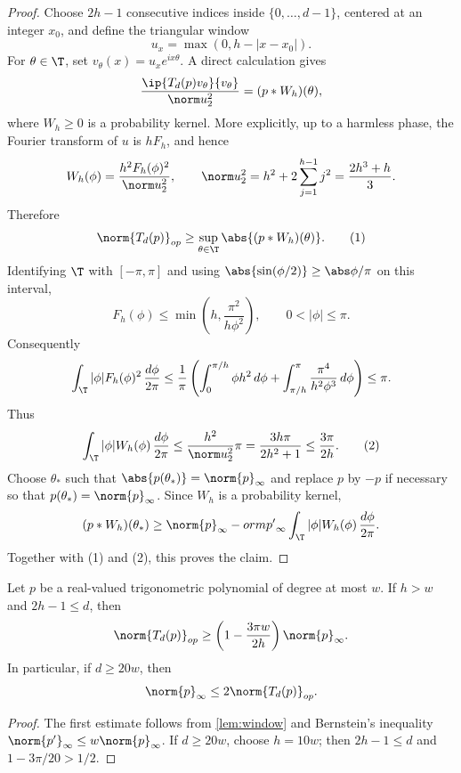 \begin{proof}
Choose $2h-1$ consecutive indices inside $\{0,\ldots,d-1\}$, centered at an
integer $x_0$, and define the triangular window
\[
   u_x=\max(0,h-|x-x_0|).
\]
For $\theta\in\T$, set $v_\theta(x)=u_xe^{ix\theta}$.  A direct calculation gives
\[
   \frac{\ip{T_d(p)v_\theta}{v_\theta}}{\norm u_2^2}=(p*W_h)(\theta),
\]
where $W_h\ge0$ is a probability kernel.  More explicitly, up to a harmless
phase, the Fourier transform of $u$ is $hF_h$, and hence
\[
   W_h(\phi)=\frac{h^2F_h(\phi)^2}{\norm u_2^2},
   \qquad
   \norm u_2^2=h^2+2\sum_{j=1}^{h-1}j^2=\frac{2h^3+h}{3} .
\]
Therefore
\[
   \norm{T_d(p)}_{op}\ge\sup_{\theta\in\T}\abs{(p*W_h)(\theta)} . \tag{1}
\]
Identifying $\T$ with $[-\pi,\pi]$ and using
$\abs{\sin(\phi/2)}\ge\abs\phi/\pi$ on this interval,
\[
   F_h(\phi)\le\min\!\left(h,\frac{\pi^2}{h\phi^2}\right),
   \qquad 0<|\phi|\le\pi .
\]
Consequently
\[
 \int_\T |\phi|F_h(\phi)^2\,\frac{d\phi}{2\pi}
 \le \frac1\pi\left(\int_0^{\pi/h}\phi h^2\,d\phi
       +\int_{\pi/h}^\pi \frac{\pi^4}{h^2\phi^3}\,d\phi\right)
 \le \pi .
\]
Thus
\[
   \int_\T |\phi|W_h(\phi)\,\frac{d\phi}{2\pi}
   \le \frac{h^2}{\norm u_2^2}\pi
   =\frac{3h\pi}{2h^2+1}\le \frac{3\pi}{2h}. \tag{2}
\]
Choose $\theta_*$ such that $\abs{p(\theta_*)}=\norm{p}_\infty$ and replace $p$
by $-p$ if necessary so that $p(\theta_*)=\norm{p}_\infty$.  Since $W_h$ is a
probability kernel,
\[
   (p*W_h)(\theta_*)
   \ge \norm{p}_\infty-
orm{p'}_\infty
      \int_\T |\phi|W_h(\phi)\,\frac{d\phi}{2\pi} .
\]
Together with (1) and (2), this proves the claim.
\end{proof}

\begin{lemma}\label{lem:symbol-transfer}
Let $p$ be a real-valued trigonometric polynomial of degree at most $w$.  If
$h>w$ and $2h-1\le d$, then
\[
   \norm{T_d(p)}_{op}
   \ge\left(1-\frac{3\pi w}{2h}\right)\norm{p}_\infty .
\]
In particular, if $d\ge20w$, then
\[
   \norm{p}_\infty\le2\norm{T_d(p)}_{op} .
\]
\end{lemma}

\begin{proof}
The first estimate follows from \cref{lem:window} and Bernstein's inequality
$\norm{p'}_\infty\le w\norm{p}_\infty$.  If $d\ge20w$, choose $h=10w$; then
$2h-1\le d$ and $1-3\pi/20>1/2$.
\end{proof}

